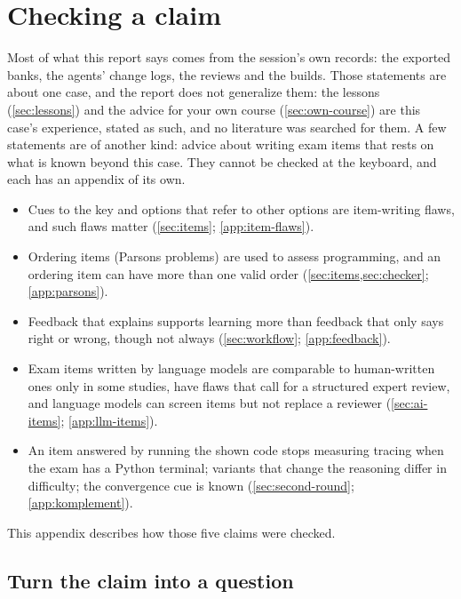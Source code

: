 
\chapter{Checking a claim}
\label{app:method}

Most of what this report says comes from the session's own records: the
exported banks, the agents' change logs, the reviews and the builds.  Those
statements are about one case, and the report does not generalize them:
the lessons (\cref{sec:lessons}) and the advice for your own course
(\cref{sec:own-course}) are this case's experience, stated as such, and
no literature was searched for them.
A few statements are of another kind: advice about writing exam items that
rests on what is known beyond this case.  They cannot be checked at the
keyboard, and each has an appendix of its own.
\begin{itemize}
  \item Cues to the key and options that refer to other options are
    item-writing flaws, and such flaws matter
    (\cref{sec:items}; \cref{app:item-flaws}).
  \item Ordering items (Parsons problems) are used to assess programming,
    and an ordering item can have more than one valid order
    (\cref{sec:items,sec:checker}; \cref{app:parsons}).
  \item Feedback that explains supports learning more than feedback that
    only says right or wrong, though not always (\cref{sec:workflow};
    \cref{app:feedback}).
  \item Exam items written by language models are comparable to
    human-written ones only in some studies, have flaws that call for a
    structured expert review, and language models can screen items but
    not replace a reviewer (\cref{sec:ai-items}; \cref{app:llm-items}).
  \item An item answered by running the shown code stops measuring
    tracing when the exam has a Python terminal; variants that change
    the reasoning differ in difficulty; the convergence cue is known
    (\cref{sec:second-round}; \cref{app:komplement}).
\end{itemize}
This appendix describes how those five claims were checked.

\section{Turn the claim into a question}

